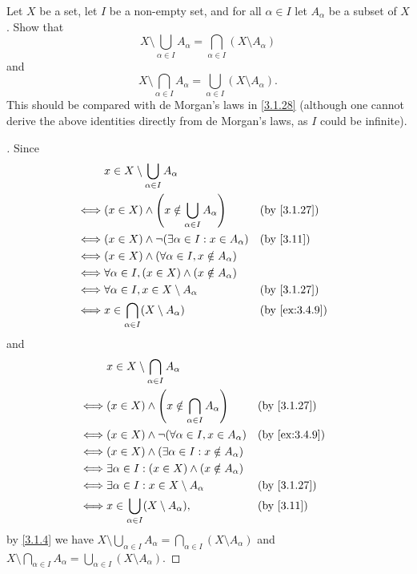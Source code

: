 \begin{ex}\label{ex:3.4.11}
  Let \(X\) be a set, let \(I\) be a non-empty set, and for all \(\alpha \in I\) let \(A_\alpha\) be a subset of \(X\).
  Show that
  \[
    X \setminus \bigcup_{\alpha \in I} A_\alpha = \bigcap_{\alpha \in I} (X \setminus A_\alpha)
  \]
  and
  \[
    X \setminus \bigcap_{\alpha \in I} A_\alpha = \bigcup_{\alpha \in I} (X \setminus A_\alpha).
  \]
  This should be compared with de Morgan's laws in \cref{3.1.28}
  (although one cannot derive the above identities directly from de Morgan's laws, as \(I\) could be infinite).
\end{ex}

\begin{proof}[]
  Since
  \begin{align*}
         & x \in X \setminus \bigcup_{\alpha \in I} A_\alpha                                \\
    \iff & (x \in X) \land \pa{x \notin \bigcup_{\alpha \in I} A_\alpha} &  & \by{3.1.27}   \\
    \iff & (x \in X) \land \lnot(\exists \alpha \in I : x \in A_\alpha)  &  & \by{3.11}     \\
    \iff & (x \in X) \land (\forall \alpha \in I, x \notin A_\alpha)                        \\
    \iff & \forall \alpha \in I, (x \in X) \land (x \notin A_\alpha)                        \\
    \iff & \forall \alpha \in I, x \in X \setminus A_\alpha              &  & \by{3.1.27}   \\
    \iff & x \in \bigcap_{\alpha \in I} (X \setminus A_\alpha)           &  & \by{ex:3.4.9}
  \end{align*}
  and
  \begin{align*}
         & x \in X \setminus \bigcap_{\alpha \in I} A_\alpha                                \\
    \iff & (x \in X) \land \pa{x \notin \bigcap_{\alpha \in I} A_\alpha} &  & \by{3.1.27}   \\
    \iff & (x \in X) \land \lnot(\forall \alpha \in I, x \in A_\alpha)   &  & \by{ex:3.4.9} \\
    \iff & (x \in X) \land (\exists \alpha \in I : x \notin A_\alpha)                       \\
    \iff & \exists \alpha \in I : (x \in X) \land (x \notin A_\alpha)                       \\
    \iff & \exists \alpha \in I : x \in X \setminus A_\alpha             &  & \by{3.1.27}   \\
    \iff & x \in \bigcup_{\alpha \in I} (X \setminus A_\alpha),          &  & \by{3.11}
  \end{align*}
  by \cref{3.1.4} we have \(X \setminus \bigcup_{\alpha \in I} A_\alpha = \bigcap_{\alpha \in I} (X \setminus A_\alpha)\) and \(X \setminus \bigcap_{\alpha \in I} A_\alpha = \bigcup_{\alpha \in I} (X \setminus A_\alpha)\).
\end{proof}

